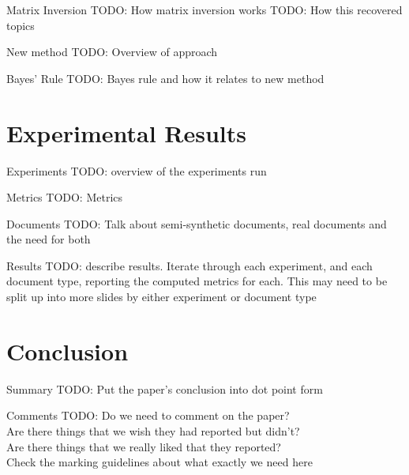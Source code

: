 \documentclass{lecture}
\begin{document}
\begin{plain}{Matrix Inversion}
TODO: How matrix inversion works
TODO: How this recovered topics
\end{plain}

\begin{plain}{New method}
TODO: Overview of approach
\end{plain}

\begin{plain}{Bayes' Rule}
TODO: Bayes rule and how it relates to new method
\end{plain}

\section[Results]{Experimental Results}
\begin{plain}{Experiments}
TODO: overview of the experiments run
\end{plain}

\begin{plain}{Metrics}
TODO: Metrics
\end{plain}

\begin{plain}{Documents}
TODO: Talk about semi-synthetic documents, real documents and the need for both
\end{plain}

\begin{plain}{Results}
TODO: describe results. Iterate through each experiment, and each document type, reporting the computed metrics for each. This may need to be split up into more slides by either experiment or document type
\end{plain}

\section[Conclusion]{Conclusion}
\begin{plain}{Summary}
TODO: Put the paper's conclusion into dot point form
\end{plain}

\begin{plain}{Comments}
TODO: Do we need to comment on the paper?\\
Are there things that we wish they had reported but didn't?\\
Are there things that we really liked that they reported?\\
Check the marking guidelines about what exactly we need here\\
\end{plain}
\end{document}
